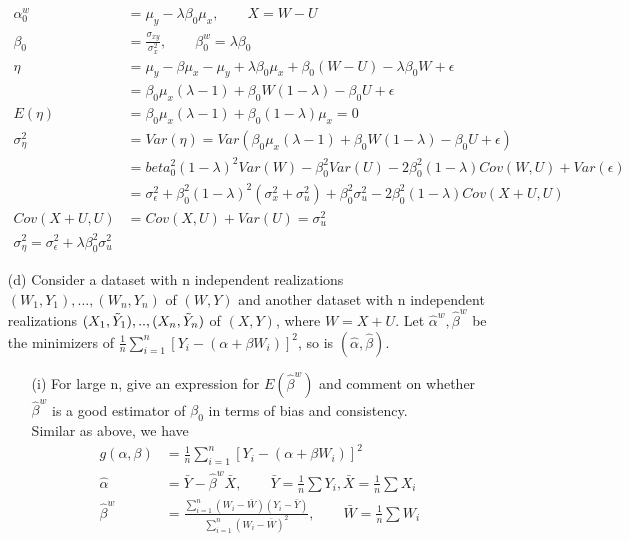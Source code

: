\begin{itemize}
\begin{align*}
    \alpha_0^w &= \mu_y - \lambda \beta_0\mu_x, \qquad X= W-U\\
    \beta_0 &= \frac{\sigma_{xy}}{\sigma_x^2}, \qquad \beta_0^{w} = \lambda \beta_0\\
    \eta &=  \mu_y - \beta \mu_x -  \mu_y + \lambda \beta_0\mu_x + \beta_0 (W-U) -\lambda \beta_0 W + \epsilon\\
    &= \beta_0\mu_x(\lambda - 1) + \beta_0W (1-\lambda) -\beta_0 U + \epsilon\\
    E(\eta) &= \beta_0\mu_x(\lambda - 1)+ \beta_0 (1-\lambda) \mu_x =0\\
    \sigma_\eta^2 &= Var(\eta) = Var(\beta_0\mu_x(\lambda - 1) + \beta_0 W (1-\lambda) -\beta_0 U + \epsilon)\\
    &= beta_0^2(1-\lambda)^2Var(W) - \beta_0^2 Var(U) -2 \beta_0^2 (1-\lambda) Cov(W,U) + Var(\epsilon)\\
    &= \sigma_\epsilon^2 + \beta_0^2(1-\lambda)^2 (\sigma_x^2 + \sigma_u^2) + \beta_0^2\sigma_u^2 - 2\beta_0^2(1-\lambda) Cov(X+U, U)\\
    Cov(X+U, U) &= Cov(X,U) + Var(U) = \sigma_u^2\\
    \sigma_\eta^2 = \sigma_\epsilon^2 + \lambda\beta_0^2\sigma_u^2
    \end{align*}     
    \item[(d)] Consider a dataset with n independent realizations $(W_1, Y_1), ..., (W_n,Y_n)$ of $(W,Y)$ and another dataset with n independent realizations $(X_1, \Tilde{Y}_1),.. , (X_n, \Tilde{Y}_n)$ of $(X,Y)$, where $W= X+U$. Let $\hat{\alpha}^w, \hat{\beta}^w$ be the minimizers of $\frac{1}{n} \sum_{i=1}^{n} [Y_i - (\alpha+ \beta W_i)]^2$, so is $(\hat{\alpha}, \hat{\beta})$. \\
    \begin{itemize}
        \item [(i)] For large n, give an expression for $E(\hat{\beta}^w)$ and comment on whether $\hat{\beta}^w$ is a good estimator of $\beta_0$ in terms of bias and consistency.\\
        Similar as above, we have 
     \begin{align*}
    g(\alpha, \beta) &=\frac{1}{n} \sum_{i=1}^{n} [Y_i - (\alpha+ \beta W_i)]^2\\
    \hat{\alpha} &= \bar{Y} - \hat{\beta}^w \bar{X}, \qquad \bar{Y} = \frac{1}{n}\sum Y_i,\bar{X} = \frac{1}{n}\sum X_i \\
    \hat{\beta}^w &= \frac{\sum_{i=1}^n (W_i - \bar{W})(Y_i - \bar{Y})}{\sum_{i=1}^n (W_i-\bar{W})^2}, \qquad \bar{W} = \frac{1}{n} \sum W_i \\

\end{align*}
\end{itemize}
\end{itemize}
